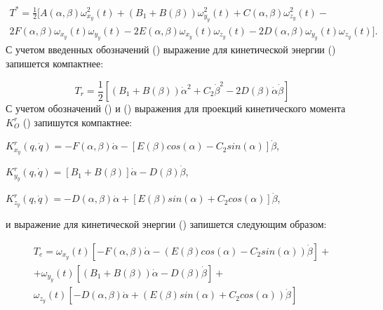 \begin{equation} %
\label{eq:p3:25}
\begin{multlined}
T^{\ast}=
\frac{1}{2} 
[ 
	A ( \alpha, \beta ) \omega_{x_{y}}^{2} ( t ) + 
	( B_{1}+B ( \beta ) ) \omega_{y_{y}}^{2} ( t ) +
	C ( \alpha, \beta ) \omega_{z_{y}}^{2} ( t ) - \\
	2F ( \alpha, \beta ) \omega_{x_{y}} ( t ) \omega_{y_{y}} ( t ) -
	2E ( \alpha, \beta ) \omega_{x_{y}} ( t ) \omega_{z_{y}} ( t ) -
	2D ( \alpha, \beta ) \omega_{y_{y}} ( t ) \omega_{z_{y}} ( t ) 
] .
\end{multlined}
\end{equation}
С учетом введенных обозначений () выражение для кинетической энергии () запишется компактнее: 


\begin{equation} %
\label{eq:p3:26}
T_{r}=
\frac{1}{2} 
[ 
	( B_{1}+B ( \beta ) ) \dot{\alpha}^{2}+
	C_{2} \dot{\beta}^{2} - 
	2D \left( \beta \right) \dot{\alpha} \dot{\beta} 
]
\end{equation}
С учетом обозначений () и () выражения для проекций кинетического момента \( K_{O}^{r} \) () запишутся компактнее: 

\( 
K_{x_{y}}^{r} ( q,\dot{q} ) =
-F ( \alpha, \beta ) \dot{\alpha} - 
[ 
	E ( \beta ) cos ( \alpha ) - 
	C_{2}sin ( \alpha ) 
] \dot{\beta} 
\), 

\( 
K_{y_{y}}^{r} ( q,\dot{q} ) = 
[ B_{1}+B \left( \beta \right) ] \dot{\alpha} -
D ( \beta ) \dot{\beta} 
\), 

\( 
K_{z_{y}}^{r} ( q,\dot{q} ) =
-D ( \alpha, \beta ) \dot{\alpha} + 
[ 
E ( \beta ) sin ( \alpha ) +
C_{2}cos ( \alpha ) 
] \dot{\beta} 
\), 

и выражение для кинетической энергии () запишется следующим образом:


\begin{equation} %
\label{eq:p3:27}
\begin{multlined}
T_{e}= 
	\omega_{x_{y}} ( t ) 
	[ 
		-F ( \alpha, \beta ) \dot{\alpha} - 
		( 
			E ( \beta ) cos ( \alpha ) -
			C_{2}sin ( \alpha ) 
		) 
		\dot{\beta } 
	] + \\
	+ \omega_{y_{y}} ( t ) 
	[ 
		( B_{1}+B ( \beta ) ) 
		\dot{\alpha} -
		D ( \beta ) \dot{\beta } 
	] + \\
	\omega_{z_{y}} ( t ) 
	[ 
		-D ( \alpha, \beta ) \dot{\alpha} + 
		( 
			E ( \beta ) sin ( \alpha ) +
			C_{2}cos ( \alpha ) 
		) \dot{\beta } 
	] 
\end{multlined}
\end{equation}

